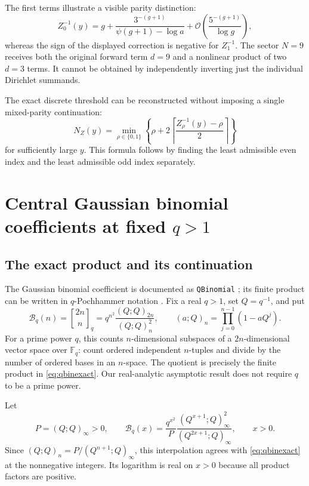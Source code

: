 \documentclass[11pt,a4paper]{article}
\theoremstyle{definition}
\theoremstyle{remark}
\newcommand{\OO}{\mathcal O}
\newcommand{\qbin}[3]{\genfrac{[}{]}{0pt}{}{#1}{#2}_{#3}}
\numberwithin{equation}{section}
\begin{document}
The first terms illustrate a visible parity distinction:
\begin{equation}
 Z_0^{-1}(y)=g+\frac{3^{-(g+1)}}{\psi(g+1)-\log a}
 +\OO\!\left(\frac{5^{-(g+1)}}{\log g}\right),
 \label{eq:zigzagevenfirst}
\end{equation}
whereas the sign of the displayed correction is negative for $Z_1^{-1}$. The sector $N=9$ receives both the original forward term $d=9$ and a nonlinear product of two $d=3$ terms. It cannot be obtained by independently inverting just the individual Dirichlet summands.

The exact discrete threshold can be reconstructed without imposing a single mixed-parity continuation:
\begin{equation}
 N_Z(y)=\min_{\rho\in\{0,1\}}
 \left\{\rho+2\left\lceil\frac{Z_\rho^{-1}(y)-\rho}{2}\right\rceil\right\}
 \label{eq:zigzagthreshold}
\end{equation}
for sufficiently large $y$. This formula follows by finding the least admissible even index and the least admissible odd index separately.

\section{Central Gaussian binomial coefficients at fixed \texorpdfstring{$q>1$}{q>1}}
\label{sec:qbinomial}

\subsection{The exact product and its continuation}
The Gaussian binomial coefficient is documented as \texttt{QBinomial} \cite{wlqbinomial}; its finite product can be written in $q$-Pochhammer notation \cite{wlqpochhammer}. Fix a real $q>1$, set $Q=q^{-1}$, and put
\begin{equation}
 \mathcal B_q(n)=\qbin{2n}{n}{q}
 =q^{n^2}\frac{(Q;Q)_{2n}}{(Q;Q)_n^2},\qquad
 (a;Q)_n=\prod_{j=0}^{n-1}(1-aQ^j).
 \label{eq:qbinexact}
\end{equation}
For a prime power $q$, this counts $n$-dimensional subspaces of a $2n$-dimensional vector space over $\mathbb F_q$: count ordered independent $n$-tuples and divide by the number of ordered bases in an $n$-space. The quotient is precisely the finite product in \eqref{eq:qbinexact}. Our real-analytic asymptotic result does not require $q$ to be a prime power.

Let
\begin{equation}
 P=(Q;Q)_\infty>0,\qquad
 \mathcal B_q(x)=\frac{q^{x^2}}{P}
 \frac{(Q^{x+1};Q)_\infty^2}{(Q^{2x+1};Q)_\infty},
 \qquad x>0.
 \label{eq:qbininterp}
\end{equation}
Since $(Q;Q)_n=P/(Q^{n+1};Q)_\infty$, this interpolation agrees with \eqref{eq:qbinexact} at the nonnegative integers. Its logarithm is real on $x>0$ because all product factors are positive.
\end{document}
